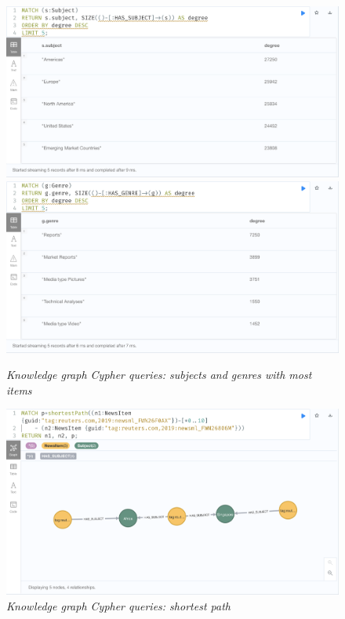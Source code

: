 \documentclass[11pt]{article}
\begin{document}
\begin{figure}
  \includegraphics[scale=0.2]{02-subjects-with-most-items}
  \includegraphics[scale=0.2]{02-genres-with-most-items}
  \caption{\textit{Knowledge graph Cypher queries: subjects and genres with most items}}
\end{figure}

\begin{figure}
  \centerline{\includegraphics[scale=0.2]{03-shortest-path}}
  \caption{\textit{Knowledge graph Cypher queries: shortest path}}
\end{figure}
\end{document}
